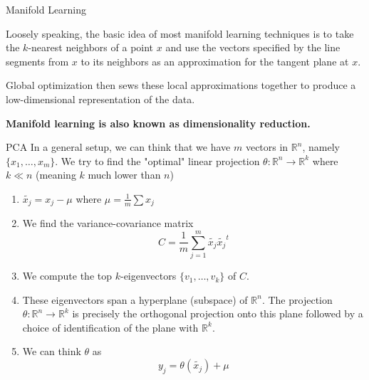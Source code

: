 \documentclass{beamer}
\begin{document}
\begin{frame}{Manifold Learning }
	
	Loosely speaking, the basic idea of most manifold learning techniques is to take the $k$-nearest neighbors of a point $x$ and use the vectors specified by the line segments from $x$ to its neighbors as an approximation for the tangent plane at $x$. 
	
	Global optimization then sews these local approximations together to produce a low-dimensional representation of the data. 
	
\begin{center}
\textbf{Manifold learning is also known as dimensionality reduction.} 
\end{center}
\end{frame}


\begin{frame}{PCA}
	In a general setup, we can think that we have $m$ vectors in $\mathbb{R}^n$, namely $\{x_1, \ldots, x_m\}$. We try to find the "optimal" linear projection $\theta \colon \mathbb{R}^n \to \mathbb{R}^k$ where $k \ll n$ (meaning $k$ much lower than $n$)
	\begin{enumerate}
	\item $\tilde{x_j} = x_j -\mu$ where $\mu= \frac{1}{m} \sum x_j$
	\item We find the variance-covariance matrix 
	\begin{equation*}
		C=\frac{1}{m} \sum_{j=1}^m \tilde{x_j} \tilde{x_j}^t
	\end{equation*}
	\item We compute the top $k$-eigenvectors $\{v_1, \ldots, v_k\}$ of $C$.
	\item These eigenvectors span a hyperplane (subspace) of $\mathbb{R}^n$. The projection $\theta \colon \mathbb{R}^n \to \mathbb{R}^k$ is precisely the orthogonal projection onto this plane followed by a choice of identification of the plane with $\mathbb{R}^k$.
	\item We can think $\theta$ as 
	\begin{equation*}
		y_j= \theta(\tilde{x_j})+ \mu
	\end{equation*}
	
	\end{enumerate}


\end{frame}
\end{document}
